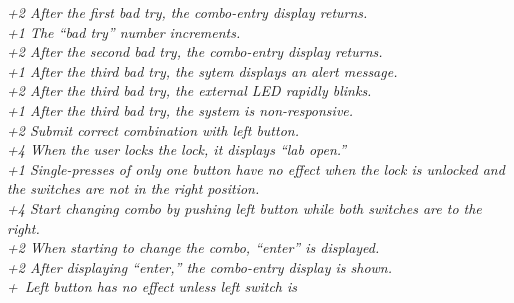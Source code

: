 \begin{enumerate}
    \textit{+2 After the first bad try, the combo-entry display returns.}
 \\
    \textit{+1 The ``bad try'' number increments.} \\
    \textit{+2 After the second bad try, the combo-entry display returns.}
 \\
    \textit{+1 After the third bad try, the sytem displays an alert message.} \\
    \textit{+2 After the third bad try, the external LED rapidly blinks.}
 \\
    \textit{+1 After the third bad try, the system is non-responsive.}
 \\
    \textit{+2 Submit correct combination with left button.} \\
    \textit{+4 When the user locks the lock, it displays ``lab open.''}
 \\
    \textit{+1 Single-presses of only one button have no effect when the lock is unlocked and the switches are not in the right position.}
 \\
    \textit{+4 Start changing combo by pushing left button while both switches
        are to the right.} \\
    \textit{+2 When starting to change the combo, ``enter'' is displayed.} \\
    \textit{+2 After displaying ``enter,'' the combo-entry display is shown.}
 \\
    \textit{+\textonehalf\ Left button has no effect unless left switch is
}
\end{enumerate}
